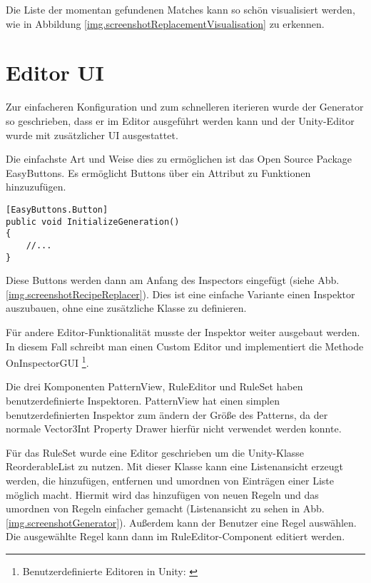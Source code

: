Die Liste der momentan gefundenen Matches kann so schön visualisiert werden, wie in Abbildung \ref{img.screenshotReplacementVisualisation} zu erkennen.


\section{Editor UI}\label{s.editorUI}

Zur einfacheren Konfiguration und zum schnelleren iterieren wurde der Generator so geschrieben, dass er im Editor ausgeführt werden kann und der Unity-Editor wurde mit zusätzlicher UI ausgestattet.

Die einfachste Art und Weise dies zu ermöglichen ist das Open Source Package EasyButtons. Es ermöglicht Buttons über ein Attribut zu Funktionen hinzuzufügen.

\begin{lstlisting}[label=l.buttonAttribute, caption={Beispiel eines EasyButtons-Attributs}] 
[EasyButtons.Button]
public void InitializeGeneration()
{
    //...
}
\end{lstlisting}

Diese Buttons werden dann am Anfang des Inspectors eingefügt (siehe Abb. \ref{img.screenshotRecipeReplacer}). Dies ist eine einfache Variante einen Inspektor auszubauen, ohne eine zusätzliche Klasse zu definieren.


Für andere Editor-Funktionalität musste der Inspektor weiter ausgebaut werden. In diesem Fall schreibt man einen Custom Editor und implementiert die Methode OnInspectorGUI
\footnote{Benutzerdefinierte Editoren in Unity: \cite[Seite: editor-CustomEditors]{unityManual}}.

Die drei Komponenten PatternView, RuleEditor und RuleSet haben benutzerdefinierte Inspektoren. PatternView hat einen simplen benutzerdefinierten Inspektor zum ändern der Größe des Patterns, da der normale Vector3Int Property Drawer hierfür nicht verwendet werden konnte. 

Für das RuleSet wurde eine Editor geschrieben um die Unity-Klasse ReorderableList zu nutzen. Mit dieser Klasse kann eine Listenansicht erzeugt werden, die hinzufügen, entfernen und umordnen von Einträgen einer Liste möglich macht. Hiermit wird das hinzufügen von neuen Regeln und das umordnen von Regeln einfacher gemacht (Listenansicht zu sehen in Abb. \ref{img.screenshotGenerator}). Außerdem kann der Benutzer eine Regel auswählen. Die ausgewählte Regel kann dann im RuleEditor-Component editiert werden.

